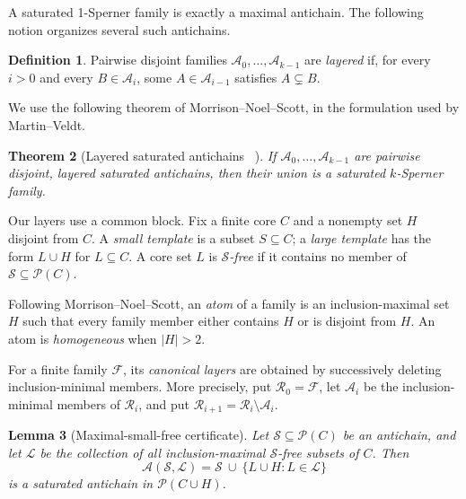 \documentclass[11pt]{article}
\newtheorem{theorem}{Theorem}[section]
\newtheorem{lemma}[theorem]{Lemma}
\theoremstyle{definition}
\newtheorem{definition}[theorem]{Definition}
\theoremstyle{remark}
\newcommand{\powerset}{\mathcal{P}}
\newcommand{\family}{\mathcal{F}}
\newcommand{\smallcores}{\mathcal{S}}
\newcommand{\largecores}{\mathcal{L}}
\begin{document}
A saturated 1-Sperner family is exactly a maximal antichain.  The following
notion organizes several such antichains.

\begin{definition}
Pairwise disjoint families $\mathcal A_0,\ldots,\mathcal A_{k-1}$ are
\emph{layered} if, for every $i>0$ and every $B\in\mathcal A_i$, some
$A\in\mathcal A_{i-1}$ satisfies $A\subsetneq B$.
\end{definition}

We use the following theorem of Morrison--Noel--Scott, in the formulation used
by Martin--Veldt.

\begin{theorem}[Layered saturated antichains~
  \cite{mns2014,martinveldt2025}]
\label{thm:layered}
If $\mathcal A_0,\ldots,\mathcal A_{k-1}$ are pairwise disjoint, layered
saturated antichains, then their union is a saturated $k$-Sperner family.
\end{theorem}

Our layers use a common block.  Fix a finite core $C$ and a nonempty set $H$
disjoint from $C$.  A \emph{small template} is a subset $S\subseteq C$; a
\emph{large template} has the form $L\cup H$ for $L\subseteq C$.  A core set
$L$ is \emph{$\smallcores$-free} if it contains no member of
$\smallcores\subseteq\powerset(C)$.

Following Morrison--Noel--Scott, an \emph{atom} of a family is an
inclusion-maximal set $H$ such that every family member either contains $H$
or is disjoint from $H$.  An atom is \emph{homogeneous} when $|H|>2$.

For a finite family $\family$, its \emph{canonical layers} are obtained by
successively deleting inclusion-minimal members.  More precisely, put
$\mathcal R_0=\family$, let $\mathcal A_i$ be the inclusion-minimal members
of $\mathcal R_i$, and put
$\mathcal R_{i+1}=\mathcal R_i\setminus\mathcal A_i$.

\begin{lemma}[Maximal-small-free certificate]
\label{lem:maximal-free}
Let $\smallcores\subseteq\powerset(C)$ be an antichain, and let
$\largecores$ be the collection of all inclusion-maximal
$\smallcores$-free subsets of $C$.  Then
\[
  \mathcal A(\smallcores,\largecores)
  =\smallcores\ \cup\ \{L\cup H:L\in\largecores\}
\]
is a saturated antichain in $\powerset(C\cup H)$.
\end{lemma}
\end{document}
